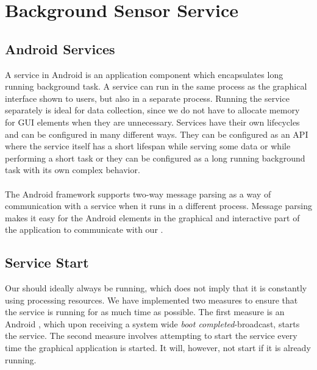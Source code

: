 
\section{Background Sensor Service}
\label{sec:background_sensor_service}


\subsection{Android Services}

A service in Android is an application component which encapsulates long running background task. A service can run in the same process as the graphical interface shown to users, but also in a separate process. Running the service separately is ideal for data collection, since we do not have to allocate memory for GUI elements when they are unnecessary. Services have their own lifecycles and can be configured in many different ways. They can be configured as an API where the service itself has a short lifespan while serving some data or while performing a short task or they can be configured as a long running background task with its own complex behavior.
\\\\
The Android framework supports two-way message parsing as a way of communication with a service when it runs in a different process. Message parsing makes it easy for the Android  elements in the graphical and interactive part of the application to communicate with our .

\subsection{Service Start}
\label{sub:service_start}
Our  should ideally always be running, which does not imply that it is constantly using processing resources. We have implemented two measures to ensure that the service is running for as much time as possible. The first measure is an Android , which upon receiving a system wide \emph{boot completed}-broadcast, starts the service. The second measure involves attempting to start the service every time the graphical application is started. It will, however, not start if it is already running.

